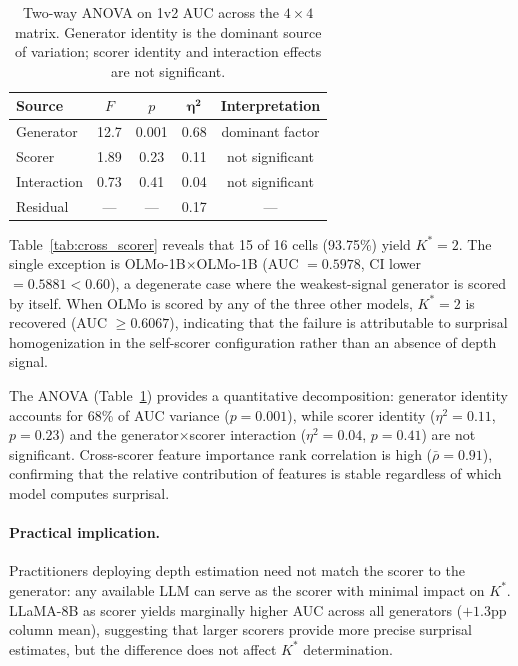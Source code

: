 \documentclass[11pt]{article}
\newcommand{\Kstar}{K^{*}}
\begin{document}
\begin{table}[t]
\centering
\caption{Two-way ANOVA on 1v2 AUC across the $4\!\times\!4$ matrix. Generator identity is the dominant source of variation; scorer identity and interaction effects are not significant.}
\label{tab:anova}
\small
\begin{tabular}{lcccc}
\toprule
\textbf{Source} & \textbf{$F$} & \textbf{$p$} & $\boldsymbol{\eta^2}$ & \textbf{Interpretation} \\
\midrule
Generator   & 12.7 & 0.001  & 0.68 & dominant factor \\
Scorer      & 1.89 & 0.23   & 0.11 & not significant \\
Interaction & 0.73 & 0.41   & 0.04 & not significant \\
Residual    & ---  & ---    & 0.17 & --- \\
\bottomrule
\end{tabular}
\end{table}

Table~\ref{tab:cross_scorer} reveals that 15 of 16 cells (93.75\%) yield $\Kstar\!=\!2$.
The single exception is OLMo-1B$\times$OLMo-1B (AUC $= 0.5978$, CI lower $= 0.5881 < 0.60$), a degenerate case where the weakest-signal generator is scored by itself.
When OLMo is scored by any of the three other models, $\Kstar\!=\!2$ is recovered (AUC $\geq 0.6067$), indicating that the failure is attributable to surprisal homogenization in the self-scorer configuration rather than an absence of depth signal.

The ANOVA (Table~\ref{tab:anova}) provides a quantitative decomposition: generator identity accounts for 68\% of AUC variance ($p\!=\!0.001$), while scorer identity ($\eta^2\!=\!0.11$, $p\!=\!0.23$) and the generator$\times$scorer interaction ($\eta^2\!=\!0.04$, $p\!=\!0.41$) are not significant.
Cross-scorer feature importance rank correlation is high ($\bar{\rho}\!=\!0.91$), confirming that the relative contribution of features is stable regardless of which model computes surprisal.

\paragraph{Practical implication.}
Practitioners deploying depth estimation need not match the scorer to the generator: any available LLM can serve as the scorer with minimal impact on $\Kstar$.
LLaMA-8B as scorer yields marginally higher AUC across all generators ($+1.3$pp column mean), suggesting that larger scorers provide more precise surprisal estimates, but the difference does not affect $\Kstar$ determination.
\end{document}
